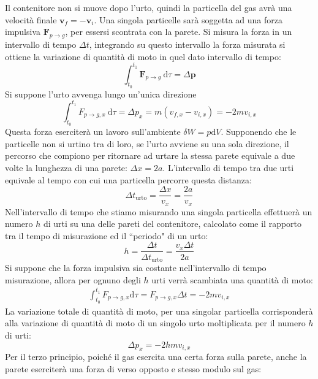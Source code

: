 \documentclass{article}
\newcommand{\vect}[1]{\boldsymbol{\mathbf{#1}}}
\newcommand{\df}{\mathrm{d}}
\numberwithin{equation}{subsection}
\begin{document}
Il contenitore non si muove 
dopo l'urto, quindi la particella del gas avrà una velocità 
finale $\vect v_f=-\vect v_i$.  
Una singola particelle sarà soggetta ad una forza impulsiva 
$\vect{F}_{p\to g}$, 
per essersi scontrata con la parete. Si misura la forza in 
un intervallo di tempo $\Delta t$, integrando su questo intervallo la forza misurata si ottiene 
la variazione di quantità di moto in quel dato intervallo di tempo:
\begin{equation*}
    \int_{t_0}^{t_1}\vect{F}_{p\to g}\:\df\tau=\Delta\vect{p}
\end{equation*}
Si suppone l'urto avvenga lungo un'unica direzione
\begin{equation*}
    \int_{t_0}^{t_1}F_{p\to g, x}\:\df\tau=\Delta p_x=m(v_{f,x}-v_{i,x})=-2mv_{i,x}
\end{equation*}
Questa forza eserciterà un lavoro sull'ambiente 
$\delta W=p\df V$. Supponendo che le particelle non si urtino 
tra di loro, se l'urto avviene su una sola direzione, il percorso che compiono per ritornare ad urtare la stessa parete equivale a due volte la lunghezza di una parete: 
$\Delta x=2a$. 
L'intervallo di tempo tra due urti equivale al tempo con 
cui una particella percorre questa distanza: 
\begin{equation*}
    \Delta t_\mathrm{urto}=\displaystyle\frac{\Delta x}{v_x}=\frac{2a}{v_x}
\end{equation*}
Nell'intervallo di tempo che stiamo misurando una singola particella effettuerà  
un numero $h$ di urti su una delle pareti del contenitore, calcolato come il rapporto tra il tempo di misurazione ed il ``periodo" di un urto: 
\begin{equation*}
    h=\displaystyle\frac{\Delta t}{\Delta t_\mathrm{urto}}=\frac{v_x\Delta t}{2a}
\end{equation*}
Si suppone che la forza impulsiva sia costante nell'intervallo di tempo 
misurazione, allora per ognuno degli $h$ urti verrà scambiata una 
quantità di moto:
\begin{gather*}
    \int_{t_0}^{t_1}F_{p\to g,x}\df\tau=F_{p\to g,x}\Delta t=-2mv_{i,x}
\end{gather*}
La variazione totale di quantità di moto, per una singolar particella corrisponderà alla variazione di quantità di moto di un singolo urto moltiplicata per il numero $h$ di 
urti: 
\begin{equation*}
    \Delta p_x=-2hmv_{i,x}
\end{equation*}
Per il terzo principio, poiché il gas esercita una certa forza sulla parete, anche la parete eserciterà una forza di verso opposto e stesso modulo sul gas: 
\end{document}
